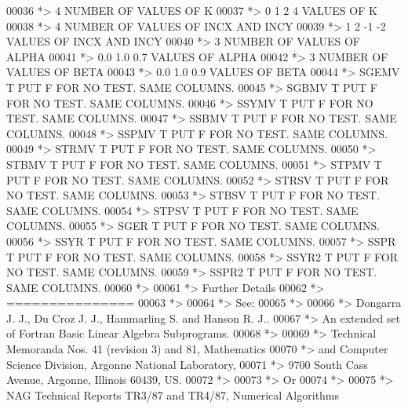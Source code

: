 \begin{DoxyCode}
00036 \textcolor{comment}{*> 4                 NUMBER OF VALUES OF K}
00037 \textcolor{comment}{*> 0 1 2 4           VALUES OF K}
00038 \textcolor{comment}{*> 4                 NUMBER OF VALUES OF INCX AND INCY}
00039 \textcolor{comment}{*> 1 2 -1 -2         VALUES OF INCX AND INCY}
00040 \textcolor{comment}{*> 3                 NUMBER OF VALUES OF ALPHA}
00041 \textcolor{comment}{*> 0.0 1.0 0.7       VALUES OF ALPHA}
00042 \textcolor{comment}{*> 3                 NUMBER OF VALUES OF BETA}
00043 \textcolor{comment}{*> 0.0 1.0 0.9       VALUES OF BETA}
00044 \textcolor{comment}{*> SGEMV  T PUT F FOR NO TEST. SAME COLUMNS.}
00045 \textcolor{comment}{*> SGBMV  T PUT F FOR NO TEST. SAME COLUMNS.}
00046 \textcolor{comment}{*> SSYMV  T PUT F FOR NO TEST. SAME COLUMNS.}
00047 \textcolor{comment}{*> SSBMV  T PUT F FOR NO TEST. SAME COLUMNS.}
00048 \textcolor{comment}{*> SSPMV  T PUT F FOR NO TEST. SAME COLUMNS.}
00049 \textcolor{comment}{*> STRMV  T PUT F FOR NO TEST. SAME COLUMNS.}
00050 \textcolor{comment}{*> STBMV  T PUT F FOR NO TEST. SAME COLUMNS.}
00051 \textcolor{comment}{*> STPMV  T PUT F FOR NO TEST. SAME COLUMNS.}
00052 \textcolor{comment}{*> STRSV  T PUT F FOR NO TEST. SAME COLUMNS.}
00053 \textcolor{comment}{*> STBSV  T PUT F FOR NO TEST. SAME COLUMNS.}
00054 \textcolor{comment}{*> STPSV  T PUT F FOR NO TEST. SAME COLUMNS.}
00055 \textcolor{comment}{*> SGER   T PUT F FOR NO TEST. SAME COLUMNS.}
00056 \textcolor{comment}{*> SSYR   T PUT F FOR NO TEST. SAME COLUMNS.}
00057 \textcolor{comment}{*> SSPR   T PUT F FOR NO TEST. SAME COLUMNS.}
00058 \textcolor{comment}{*> SSYR2  T PUT F FOR NO TEST. SAME COLUMNS.}
00059 \textcolor{comment}{*> SSPR2  T PUT F FOR NO TEST. SAME COLUMNS.}
00060 \textcolor{comment}{*>}
00061 \textcolor{comment}{*> Further Details}
00062 \textcolor{comment}{*> ===============}
00063 \textcolor{comment}{*>}
00064 \textcolor{comment}{*>    See:}
00065 \textcolor{comment}{*>}
00066 \textcolor{comment}{*>       Dongarra J. J., Du Croz J. J., Hammarling S.  and Hanson R. J..}
00067 \textcolor{comment}{*>       An  extended  set of Fortran  Basic Linear Algebra Subprograms.}
00068 \textcolor{comment}{*>}
00069 \textcolor{comment}{*>       Technical  Memoranda  Nos. 41 (revision 3) and 81,  Mathematics}
00070 \textcolor{comment}{*>       and  Computer Science  Division,  Argonne  National Laboratory,}
00071 \textcolor{comment}{*>       9700 South Cass Avenue, Argonne, Illinois 60439, US.}
00072 \textcolor{comment}{*>}
00073 \textcolor{comment}{*>       Or}
00074 \textcolor{comment}{*>}
00075 \textcolor{comment}{*>       NAG  Technical Reports TR3/87 and TR4/87,  Numerical Algorithms}

\end{DoxyCode}
